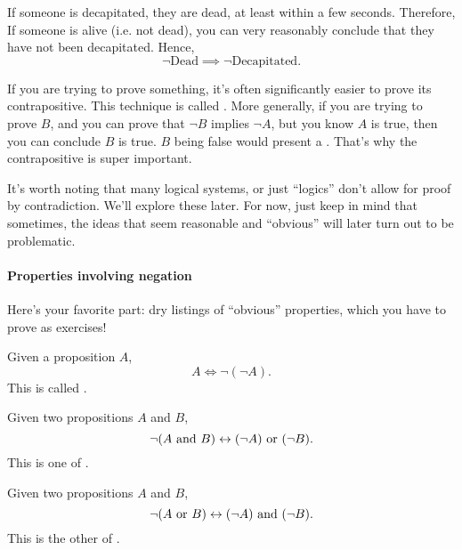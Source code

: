 \begin{example}
  If someone is decapitated, they are dead, at least within a few
  seconds. Therefore,  If someone
  is alive (i.e. not dead), you can very reasonably conclude that they
  have not been decapitated. Hence,
  $$\lnot\text{Dead} \implies \lnot\text{Decapitated}.$$
\end{example}


If you are trying to prove something, it's often significantly easier
to prove its contrapositive. This technique is called . More generally, if you are trying to prove $B$, and
you can prove that $\lnot B$ implies $\lnot A$, but you know $A$ is
true, then you can conclude $B$ is true. $B$ being false would present
a . That's why the contrapositive is super
important.

\begin{remark}
  It's worth noting that many logical systems, or just ``logics''
  don't allow for proof by contradiction. We'll explore these
  later. For now, just keep in mind that sometimes, the ideas that
  seem reasonable and ``obvious'' will later turn out to be
  problematic.
\end{remark}

\paragraph{Properties involving negation}

Here's your favorite part: dry listings of ``obvious'' properties,
which you have to prove as exercises!

\begin{lemma}
  \label{double-negation}
  Given a proposition $A$,
  $$A \iff \lnot(\lnot A).$$ This is called .
\end{lemma}
\begin{lemma}
  \label{de-morgan-1}
  Given two propositions $A$ and $B$,
  $$\lnot(A \text{ and } B) \leftrightarrow (\lnot A) \text{ or } (\lnot B).$$ This is one of
  .
\end{lemma}
\begin{lemma}
  \label{de-morgan-2}
  Given two propositions $A$ and $B$,
  $$\lnot(A \text{ or } B) \leftrightarrow (\lnot A) \text{ and } (\lnot B).$$ This is the
  other of .
\end{lemma}


